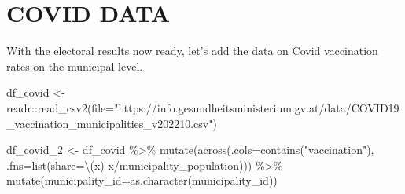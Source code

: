 \documentclass[
  letterpaper,
  DIV=11,
  numbers=noendperiod,
  oneside]{scrartcl}
\newenvironment{Shaded}{\begin{snugshade}}{\end{snugshade}}
\newcommand{\AttributeTok}[1]{\textcolor[rgb]{0.40,0.45,0.13}{#1}}
\newcommand{\CommentTok}[1]{\textcolor[rgb]{0.37,0.37,0.37}{#1}}
\newcommand{\FunctionTok}[1]{\textcolor[rgb]{0.28,0.35,0.67}{#1}}
\newcommand{\NormalTok}[1]{\textcolor[rgb]{0.00,0.23,0.31}{#1}}
\newcommand{\OtherTok}[1]{\textcolor[rgb]{0.00,0.23,0.31}{#1}}
\newcommand{\SpecialCharTok}[1]{\textcolor[rgb]{0.37,0.37,0.37}{#1}}
\newcommand{\StringTok}[1]{\textcolor[rgb]{0.13,0.47,0.30}{#1}}
\begin{document}
\begin{Shaded}
\end{Shaded}

\hypertarget{covid-data}{%
\section{COVID DATA}\label{covid-data}}

With the electoral results now ready, let's add the data on Covid
vaccination rates on the municipal level.

\begin{Shaded}
\begin{Highlighting}[]
\NormalTok{df\_covid }\OtherTok{\textless{}{-}}\NormalTok{ readr}\SpecialCharTok{::}\FunctionTok{read\_csv2}\NormalTok{(}\AttributeTok{file=}\StringTok{"https://info.gesundheitsministerium.gv.at/data/COVID19\_vaccination\_municipalities\_v202210.csv"}\NormalTok{)}

\NormalTok{df\_covid\_2 }\OtherTok{\textless{}{-}}\NormalTok{ df\_covid }\SpecialCharTok{\%\textgreater{}\%} 
  \FunctionTok{mutate}\NormalTok{(}\FunctionTok{across}\NormalTok{(}\AttributeTok{.cols=}\FunctionTok{contains}\NormalTok{(}\StringTok{"vaccination"}\NormalTok{), }\AttributeTok{.fns=}\FunctionTok{list}\NormalTok{(}\AttributeTok{share=}\NormalTok{\textbackslash{}(x) x}\SpecialCharTok{/}\NormalTok{municipality\_population))) }\SpecialCharTok{\%\textgreater{}\%} 
  \FunctionTok{mutate}\NormalTok{(}\AttributeTok{municipality\_id=}\FunctionTok{as.character}\NormalTok{(municipality\_id))}
\end{Highlighting}
\end{Shaded}
\end{document}
